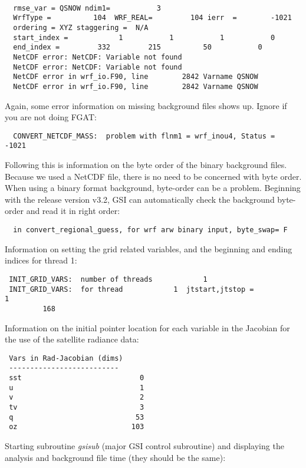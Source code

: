 \begin{scriptsize}
\begin{verbatim}
 
  rmse_var = QSNOW ndim1=           3
  WrfType =          104  WRF_REAL=         104 ierr  =        -1021
  ordering = XYZ staggering =  N/A
  start_index =            1           1           1           0  
  end_index =         332         215          50           0
  NetCDF error: NetCDF: Variable not found
  NetCDF error: NetCDF: Variable not found
  NetCDF error in wrf_io.F90, line        2842 Varname QSNOW
  NetCDF error in wrf_io.F90, line        2842 Varname QSNOW

\end{verbatim}
\end{scriptsize}
Again, some error information on missing background files shows up. Ignore if you are not doing FGAT:
\begin{scriptsize}
\begin{verbatim}
  CONVERT_NETCDF_MASS:  problem with flnm1 = wrf_inou4, Status =        -1021
\end{verbatim}
\end{scriptsize}

Following this is information on the byte order of the binary background files. Because we used a NetCDF file, there is no need to be concerned with byte order. When using a binary format background, byte-order can be a problem. Beginning with the release version v3.2, GSI can automatically check the background byte-order and read it in right order:

\begin{scriptsize}
\begin{verbatim}
  in convert_regional_guess, for wrf arw binary input, byte_swap= F
\end{verbatim}
\end{scriptsize}
Information on setting the grid related variables, and the beginning and ending indices for thread 1:
\begin{scriptsize}
\begin{verbatim}
 INIT_GRID_VARS:  number of threads            1
 INIT_GRID_VARS:  for thread            1  jtstart,jtstop =            1
         168
\end{verbatim}
\end{scriptsize} 
Information on the initial pointer location for each variable in the Jacobian for the use of the satellite radiance data: 
\begin{scriptsize}
\begin{verbatim}
 Vars in Rad-Jacobian (dims)
 --------------------------
 sst                            0
 u                              1
 v                              2
 tv                             3
 q                             53
 oz                           103
\end{verbatim}
\end{scriptsize}
Starting subroutine \textit{gsisub} (major GSI control subroutine) and displaying the analysis and background file time (they should be the same):

